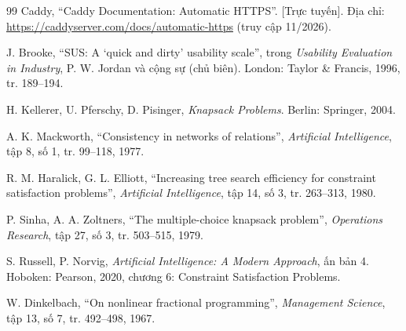 \begin{thebibliography}{99}
 Caddy, ``Caddy Documentation: Automatic HTTPS''. [Trực tuyến]. Địa chỉ: \url{https://caddyserver.com/docs/automatic-https} (truy cập 11/2026).

 J. Brooke, ``SUS: A `quick and dirty' usability scale'', trong \emph{Usability Evaluation in Industry}, P. W. Jordan và cộng sự (chủ biên). London: Taylor \& Francis, 1996, tr. 189--194.

 H. Kellerer, U. Pferschy, D. Pisinger, \emph{Knapsack Problems}. Berlin: Springer, 2004.

 A. K. Mackworth, ``Consistency in networks of relations'', \emph{Artificial Intelligence}, tập 8, số 1, tr. 99--118, 1977.

 R. M. Haralick, G. L. Elliott, ``Increasing tree search efficiency for constraint satisfaction problems'', \emph{Artificial Intelligence}, tập 14, số 3, tr. 263--313, 1980.

 P. Sinha, A. A. Zoltners, ``The multiple-choice knapsack problem'', \emph{Operations Research}, tập 27, số 3, tr. 503--515, 1979.

 S. Russell, P. Norvig, \emph{Artificial Intelligence: A Modern Approach}, ấn bản 4. Hoboken: Pearson, 2020, chương 6: Constraint Satisfaction Problems.

 W. Dinkelbach, ``On nonlinear fractional programming'', \emph{Management Science}, tập 13, số 7, tr. 492--498, 1967.

\end{thebibliography}

